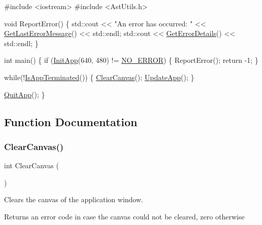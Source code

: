 \begin{DoxyCode}
\textcolor{preprocessor}{#include <iostream>}
\textcolor{preprocessor}{#include <AstUtils.h>}

\textcolor{keywordtype}{void} ReportError()
\{
    std::cout << \textcolor{stringliteral}{"An error has occurred: "} << \hyperlink{group__error__group_gac9be83c8ac2a5d80a2be46487c596eab}{GetLastErrorMessage}() << std::endl;
    std::cout << \hyperlink{group__error__group_ga8258f5044a56ed71aeed5633fc8341b6}{GetErrorDetails}() << std::endl;
\}

\textcolor{keywordtype}{int} main()
\{
    \textcolor{keywordflow}{if} (\hyperlink{group__sdl__group_ga8f43e7993cf196bb0af33a60bc93aa75}{InitApp}(640, 480) != \hyperlink{group__error__group_gga59e56af19e754a6aa26a612ebf91d05fabf350750d0d4fabd8954c0f1e9bbae94}{NO\_ERROR}) \{
        ReportError();
        \textcolor{keywordflow}{return} -1;
    \}

    \textcolor{keywordflow}{while}(!\hyperlink{group__sdl__group_ga6d29aa641d22a0299da4710022c8c96b}{IsAppTerminated}()) \{
        \hyperlink{group__sdl__group_ga4cc0ada571b47d2b809d441fa6766b52}{ClearCanvas}();
        \hyperlink{group__sdl__group_ga9bf9bfe01e7d336c3a3b13cc923ff850}{UpdateApp}();
    \}

    \hyperlink{group__sdl__group_gaf4cba1685a7c46bccc7bbdf863114cee}{QuitApp}();
\} 
\end{DoxyCode}
 

\subsection{Function Documentation}
\mbox{\label{group__sdl__group_ga4cc0ada571b47d2b809d441fa6766b52}} 
\subsubsection{\texorpdfstring{Clear\+Canvas()}{ClearCanvas()}}
{\footnotesize\ttfamily int Clear\+Canvas (\begin{DoxyParamCaption}{ }\end{DoxyParamCaption})}

Clears the canvas of the application window.

\begin{DoxyReturn}{Returns}
an error code in case the canvas could not be cleared, zero otherwise 
\end{DoxyReturn}
\mbox{\label{group__sdl__group_ga9b9387d774c6bc63e5e3c6c91296dedb}} 
